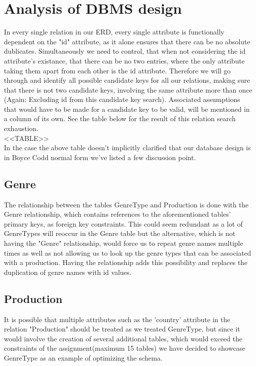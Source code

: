 \section{Analysis of DBMS design}
In every single relation in our ERD, every single attribute is functionally dependent on the "id" attribute, as it alone ensures that there can be no absolute dublicates. Simultaneously we need to control, that when not considering the id attribute's existance, that there can be no two entries, where the only attribute taking them apart from each other is the id attribute.
Therefore we will go through and identify all possible candidate keys for all our relations, making sure that there is not two candidate keys, involving the same attribute more than once (Again: Excluding id from this candidate key search). Associated assumptions that would have to be made for a candidate key to be valid, will be mentioned in a column of its own.
See the table below for the result of this relation search exhaustion.\\

<<TABLE>>\\

In the case the above table doesn't implicitly clarified that our database design is in Boyce Codd normal form we've listed a few discussion point.\\ 

\subsection{Genre}
The relationship between the tables GenreType and Production is done with the Genre relationship, which contains references to the aforementioned tables' primary keys, as foreign key constraints. This could seem redundant as a lot of GenreTypes will reoccur in the Genre table but the alternative, which is not having the "Genre" relationship, would force us to repeat genre names multiple times as well as not allowing us to look up the genre types that can be associated with a production. Having the relationship adds this possibility and replaces the duplication of genre names with id values.\\

\subsection{Production}
It is possible that multiple attributes such as the 'country' attribute in the relation "Production" should be treated as we treated GenreType, but since it would involve the creation of several additional tables, which would exceed the constraints of the assignment(maximum 15 tables) we have decided to showcase GenreType as an example of optimizing the schema.\\

